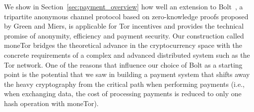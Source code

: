 We show in Section~\ref{sec:payment_overview} how well an extension to Bolt~\cite{green2017bolt}, a tripartite anonymous channel protocol based on zero-knowledge proofs proposed by Green and Miers, is applicable for Tor incentives and provides the technical promise of anonymity, efficiency and payment security. Our construction called moneTor bridges the theoretical advance in the cryptocurrency space with the concrete requirements of a complex and advanced distributed system such as the Tor network. One of the reasons that influence our choice of Bolt as a starting point is the potential that we saw in building a payment system that shifts away the heavy cryptography from the critical path when performing payments (i.e., when exchanging data, the cost of processing payments is reduced to only one hash operation with moneTor).


